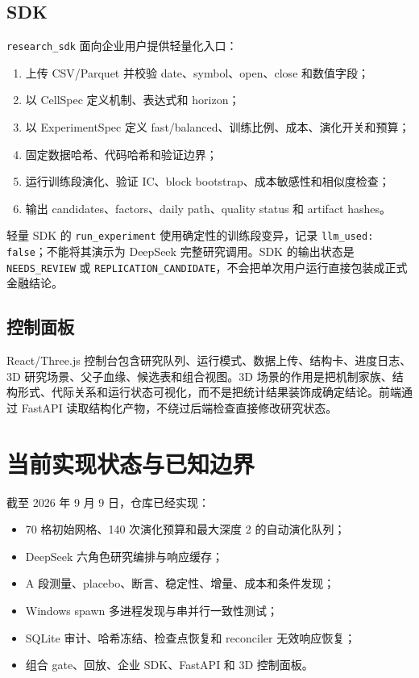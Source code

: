 \documentclass[11pt,a4paper]{article}
\newcommand{\code}[1]{\texttt{#1}}
\begin{document}
\subsection{SDK}
\code{research\_sdk} 面向企业用户提供轻量化入口：
\begin{enumerate}[leftmargin=2em]
  \item 上传 CSV/Parquet 并校验 date、symbol、open、close 和数值字段；
  \item 以 CellSpec 定义机制、表达式和 horizon；
  \item 以 ExperimentSpec 定义 fast/balanced、训练比例、成本、演化开关和预算；
  \item 固定数据哈希、代码哈希和验证边界；
  \item 运行训练段演化、验证 IC、block bootstrap、成本敏感性和相似度检查；
  \item 输出 candidates、factors、daily path、quality status 和 artifact hashes。
\end{enumerate}

轻量 SDK 的 \code{run\_experiment} 使用确定性的训练段变异，记录 \code{llm\_used: false}；不能将其演示为 DeepSeek 完整研究调用。SDK 的输出状态是 \texttt{NEEDS\_REVIEW} 或 \texttt{REPLICATION\_CANDIDATE}，不会把单次用户运行直接包装成正式金融结论。

\subsection{控制面板}
React/Three.js 控制台包含研究队列、运行模式、数据上传、结构卡、进度日志、3D 研究场景、父子血缘、候选表和组合视图。3D 场景的作用是把机制家族、结构形式、代际关系和运行状态可视化，而不是把统计结果装饰成确定结论。前端通过 FastAPI 读取结构化产物，不绕过后端检查直接修改研究状态。

\FloatBarrier


\section{当前实现状态与已知边界}
截至 2026 年 9 月 9 日，仓库已经实现：
\begin{itemize}[leftmargin=2em]
  \item 70 格初始网格、140 次演化预算和最大深度 2 的自动演化队列；
  \item DeepSeek 六角色研究编排与响应缓存；
  \item A 段测量、placebo、断言、稳定性、增量、成本和条件发现；
  \item Windows spawn 多进程发现与串并行一致性测试；
  \item SQLite 审计、哈希冻结、检查点恢复和 reconciler 无效响应恢复；
  \item 组合 gate、回放、企业 SDK、FastAPI 和 3D 控制面板。
\end{itemize}
\end{document}

